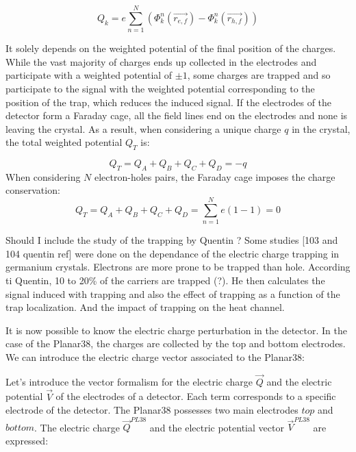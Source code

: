 \begin{equation}
\label{eq:ramo-induced-charge}
Q_k = e \sum_{n=1}^{N} \left( \Phi_k^n (\vec{r_{e,f}}) - \Phi_k^n (\vec{r_{h,f}}) \right)
\end{equation}

It solely depends on the weighted potential of the final position of the charges. While the vast majority of charges ends up collected in the electrodes and participate with a weighted potential of $\pm 1$, some charges are trapped and so participate to the signal with the weighted potential corresponding to the position of the trap, which reduces the induced signal.
If the electrodes of the detector form a Faraday cage, all the field lines end on the electrodes and none is leaving the crystal. As a result, when considering a unique charge $q$ in the crystal, the total weighted potential $Q_T$ is:

\begin{equation}
\label{eq:charge-conservation}
Q_T = Q_A + Q_B + Q_C + Q_D = -q
\end{equation}
When considering $N$ electron-holes pairs, the Faraday cage imposes the charge conservation:
\begin{equation}
\label{eq:charge-conservation}
Q_T = Q_A + Q_B + Q_C + Q_D = \sum_{n=1}^{N} e (1 - 1) = 0
\end{equation}

Should I include the study of the trapping by Quentin ? Some studies [103 and 104 quentin ref] were done on the dependance of the electric charge  trapping in germanium crystals. Electrons are more prone to be trapped than hole. According ti Quentin, 10 to 20\% of the carriers are trapped (?). He then calculates the signal induced with trapping and also the effect of trapping as a function of the trap localization. And the impact of trapping on the heat channel.

It is now possible to know the electric charge perturbation in the detector.
In the case of the Planar38, the charges are collected by the top and bottom electrodes. We can introduce the electric charge vector associated to the Planar38:

Let's introduce the vector formalism for the electric charge $\vec{Q}$ and the electric potential $\vec{V}$ of the electrodes of a detector. Each term corresponds to a specific electrode of the detector. The Planar38 possesses two main electrodes $top$ and $bottom$. The electric charge $\vec{Q}^{PL38}$ and the electric potential vector $\vec{V}^{PL38}$ are expressed:

